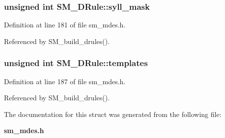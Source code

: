 \subsubsection{\setlength{\rightskip}{0pt plus 5cm}unsigned int \bf{SM\_\-DRule::syll\_\-mask}}\label{structSM__DRule_199d6d02cbf2ddfadc2d5d3139498d4e}




Definition at line 181 of file sm\_\-mdes.h.

Referenced by SM\_\-build\_\-drules().
\subsubsection{\setlength{\rightskip}{0pt plus 5cm}unsigned int \bf{SM\_\-DRule::templates}}\label{structSM__DRule_24a4fcf1c568d0436af9127745fbb4ea}




Definition at line 187 of file sm\_\-mdes.h.

Referenced by SM\_\-build\_\-drules().

The documentation for this struct was generated from the following file:\begin{CompactItemize}
\item 
\bf{sm\_\-mdes.h}\end{CompactItemize}

